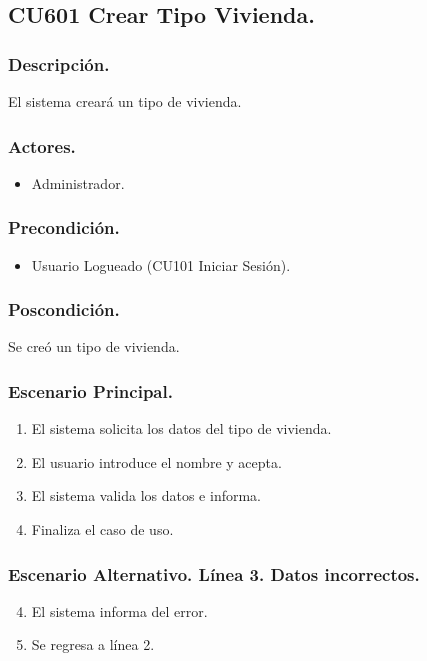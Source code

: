 \subsection{CU601 Crear Tipo Vivienda.}
\subsubsection{Descripci\'{o}n.}
El sistema crear\'{a} un tipo de vivienda.
\subsubsection{Actores.}
\begin{itemize}
\item Administrador.
\end{itemize}
\subsubsection{Precondici\'{o}n.}
\begin{itemize}
\item Usuario Logueado (CU101 Iniciar Sesi\'{o}n).
\end{itemize}
\subsubsection{Poscondici\'{o}n.}
Se cre\'{o} un tipo de vivienda.
\subsubsection{Escenario Principal.}
\begin{enumerate}
\item El sistema solicita los datos del tipo de vivienda.
\item El usuario introduce el nombre y acepta.
\item El sistema valida los datos e informa.
\item Finaliza el caso de uso.
\end{enumerate}
\subsubsection{Escenario Alternativo. L\'{i}nea 3. Datos incorrectos.}
\begin{enumerate}
\setcounter{enumi}{3}
\item El sistema informa del error.
\item Se regresa a l\'{i}nea 2.
\end{enumerate}
